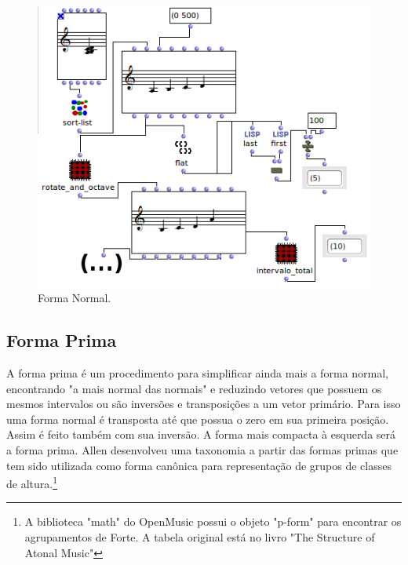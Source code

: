 \documentclass[
	12pt,				%
	openright,			%
	twoside,			%
	a4paper,			%
	english,			%
	french,				%
	spanish,			%
	brazil				%
	]{abntex2}
\begin{document}
\begin{figure}[h]
	\caption{\label{fig_grafico}Forma Normal. }
	\begin{center}
	    \includegraphics[scale=0.7]{OM_settheory/forma_normal.png}
	\end{center}
\end{figure}



\pagebreak
\subsection{Forma Prima} 

A forma prima é um procedimento para simplificar ainda mais a forma normal, encontrando "a mais normal das normais"\cite[p.47]{straus2004} e reduzindo vetores que possuem os mesmos intervalos ou são inversões e transposições a um vetor primário. Para isso uma forma normal é transposta até que possua o zero em sua primeira posição. Assim é feito também com sua inversão. A forma mais compacta à esquerda será a forma prima. Allen  desenvolveu uma taxonomia a partir das formas primas que tem sido utilizada como forma canônica para representação de grupos de classes de altura.\footnote{A biblioteca "math" do OpenMusic possui o objeto "p-form" para encontrar os agrupamentos de Forte. A tabela original está no livro "The Structure of Atonal Music"\cite[p.179-181]{forte1973structure}}
\end{document}
